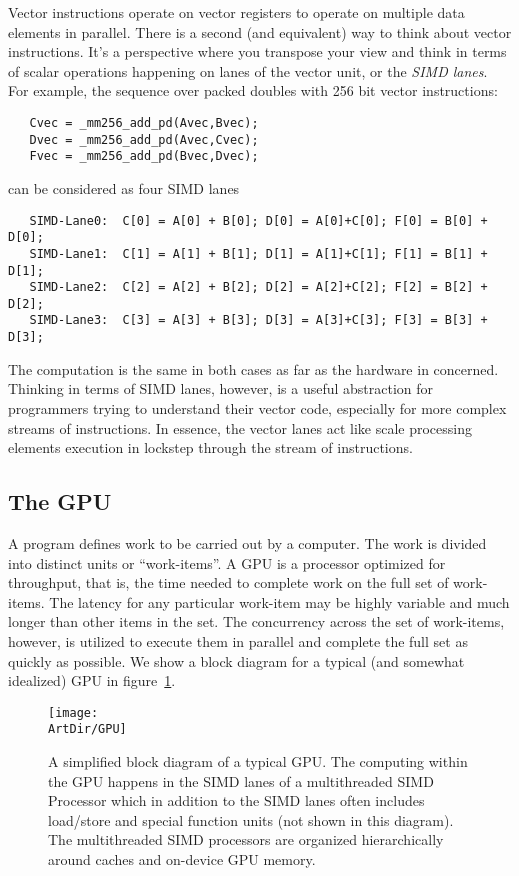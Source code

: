 Vector instructions operate on vector registers to operate on multiple data elements in parallel. There is a second (and equivalent)
way to think about vector instructions.   It's a perspective where you transpose your view and think in terms of scalar operations
happening on lanes of the vector unit, or the \emph{SIMD lanes}.   For example, the sequence over packed doubles
with 256 bit vector instructions:
\begin{verbatim}
   Cvec = _mm256_add_pd(Avec,Bvec);
   Dvec = _mm256_add_pd(Avec,Cvec);
   Fvec = _mm256_add_pd(Bvec,Dvec);
\end{verbatim}
can be considered as four SIMD lanes
\begin{verbatim}
   SIMD-Lane0:  C[0] = A[0] + B[0]; D[0] = A[0]+C[0]; F[0] = B[0] + D[0];
   SIMD-Lane1:  C[1] = A[1] + B[1]; D[1] = A[1]+C[1]; F[1] = B[1] + D[1];
   SIMD-Lane2:  C[2] = A[2] + B[2]; D[2] = A[2]+C[2]; F[2] = B[2] + D[2];
   SIMD-Lane3:  C[3] = A[3] + B[3]; D[3] = A[3]+C[3]; F[3] = B[3] + D[3];
\end{verbatim}
The computation is the same in both cases as far as the hardware in concerned.  Thinking in terms
of SIMD lanes, however, is a useful abstraction for programmers trying to understand their vector code,
especially for more complex streams of instructions.  In essence, the vector lanes act like scale processing 
elements execution in lockstep through the stream of instructions.   
   
   
\subsection{The GPU}

A program defines work to be carried out by a computer.  The work is divided into distinct units or ``work-items''.  A GPU
is a processor optimized for throughput, that is, the time needed to complete work on the full set of work-items.
The latency for any particular work-item may be highly variable and much longer than other items in the set.
The concurrency across the set of work-items, however, is utilized to execute them in parallel and complete the 
full set as quickly as possible.  We show a block diagram for a typical (and somewhat idealized) 
GPU in figure~\ref{figure:GPU}.

\begin{figure}[!htbp]
\centerline{\texttt{[image: \\ArtDir/GPU]}}
\caption{A simplified block diagram of a typical GPU.  The computing within the GPU happens in the
SIMD lanes of a multithreaded SIMD Processor which in addition to the SIMD lanes often includes
load/store and special function units (not shown in this diagram).   The multithreaded SIMD processors
are organized hierarchically around caches and on-device GPU memory.}
\label{figure:GPU}
\end{figure}

